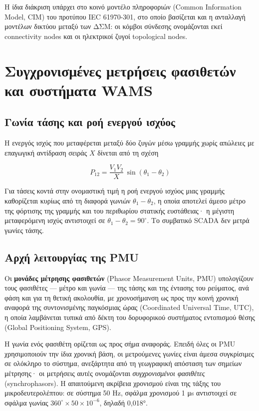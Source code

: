 Η ίδια διάκριση υπάρχει στο κοινό μοντέλο πληροφοριών (Common Information Model, CIM) του
προτύπου IEC 61970-301, στο οποίο βασίζεται και η ανταλλαγή μοντέλων δικτύου μεταξύ των ΔΣΜ:
οι κόμβοι σύνδεσης ονομάζονται εκεί connectivity nodes και οι ηλεκτρικοί ζυγοί topological
nodes.

\section{Συγχρονισμένες μετρήσεις φασιθετών και συστήματα WAMS}

\subsection{Γωνία τάσης και ροή ενεργού ισχύος}

Η ενεργός ισχύς που μεταφέρεται μεταξύ δύο ζυγών μέσω γραμμής χωρίς απώλειες με επαγωγική
αντίδραση σειράς $X$ δίνεται από τη σχέση

\begin{equation}
P_{12} = \frac{V_1 V_2}{X}\,\sin(\theta_1 - \theta_2)
\label{eq:powerflow}
\end{equation}

Για τάσεις κοντά στην ονομαστική τιμή η ροή ενεργού ισχύος μιας γραμμής καθορίζεται κυρίως από τη διαφορά γωνιών $\theta_1 - \theta_2$, η οποία
αποτελεί άμεσο μέτρο της φόρτισης της γραμμής και του περιθωρίου στατικής ευστάθειας· η μέγιστη
μεταφερόμενη ισχύς αντιστοιχεί σε $\theta_1 - \theta_2 = 90^\circ$. Το συμβατικό SCADA δεν μετρά
γωνίες τάσης.

\subsection{Αρχή λειτουργίας της PMU}

Οι \textbf{μονάδες μέτρησης φασιθετών} (Phasor Measurement Units, PMU) υπολογίζουν τους
φασιθέτες — μέτρο και γωνία — της τάσης και της έντασης του ρεύματος, ανά φάση και για τη
θετική ακολουθία, με χρονοσήμανση ως προς την κοινή χρονική αναφορά της συντονισμένης
παγκόσμιας ώρας (Coordinated Universal Time, UTC), η οποία λαμβάνεται τυπικά από δέκτη του
δορυφορικού συστήματος εντοπισμού θέσης (Global Positioning System, GPS).

Η γωνία ενός φασιθέτη ορίζεται ως προς σήμα αναφοράς. Επειδή όλες οι PMU χρησιμοποιούν την
ίδια χρονική βάση, οι μετρούμενες γωνίες είναι άμεσα συγκρίσιμες σε ολόκληρο το σύστημα,
ανεξάρτητα από τη γεωγραφική απόσταση των σημείων μέτρησης· οι μετρήσεις αυτές ονομάζονται
\emph{συγχρονισμένοι φασιθέτες} (synchrophasors). Η απαιτούμενη ακρίβεια χρονισμού είναι της
τάξης του μικροδευτερολέπτου: σε σύστημα 50 Hz, σφάλμα χρονισμού 1 μs αντιστοιχεί σε σφάλμα
γωνίας $360^\circ \times 50 \times 10^{-6}$, δηλαδή 0,018°.

